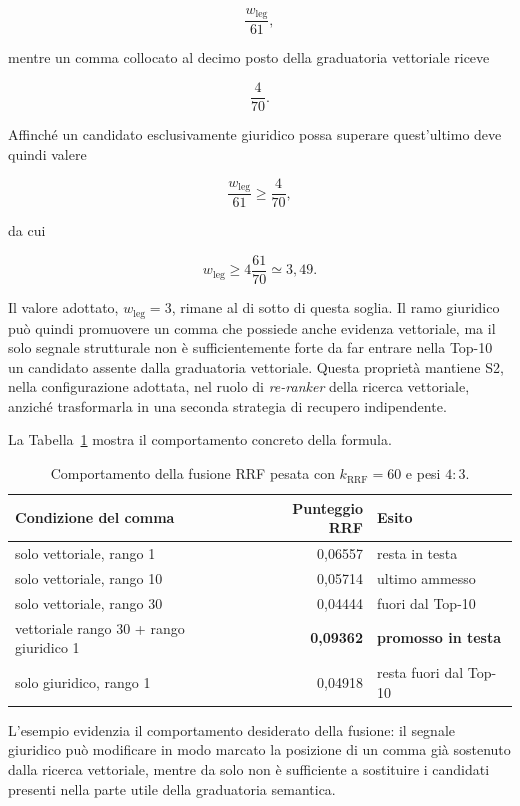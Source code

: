 $$
\frac{w_{\mathrm{leg}}}{61},
$$

mentre un comma collocato al decimo posto della graduatoria vettoriale riceve

$$
\frac{4}{70}.
$$

Affinché un candidato esclusivamente giuridico possa superare quest'ultimo deve quindi valere

$$
\frac{w_{\mathrm{leg}}}{61}
\geq
\frac{4}{70},
$$

da cui

$$
w_{\mathrm{leg}}
\geq
4\frac{61}{70}
\simeq
3{,}49.
$$

Il valore adottato, \(w_{\mathrm{leg}}=3\), rimane al di sotto di questa soglia. Il ramo giuridico può quindi promuovere un comma che possiede anche evidenza vettoriale, ma il solo segnale strutturale non è sufficientemente forte da far entrare nella Top-10 un candidato assente dalla graduatoria vettoriale. Questa proprietà mantiene S2, nella configurazione adottata, nel ruolo di \textit{re-ranker} della ricerca vettoriale, anziché trasformarla in una seconda strategia di recupero indipendente.

La Tabella~\ref{tab:aritmetica_rrf} mostra il comportamento concreto della formula.

\begin{table}[H]
\centering
\renewcommand{\arraystretch}{1.2}
\begin{tabular}{|l|r|l|}
\hline
\textbf{Condizione del comma} & \textbf{Punteggio RRF} & \textbf{Esito} \\
\hline
solo vettoriale, rango 1 & 0,06557 & resta in testa \\
solo vettoriale, rango 10 & 0,05714 & ultimo ammesso \\
solo vettoriale, rango 30 & 0,04444 & fuori dal Top-10 \\
vettoriale rango 30 + rango giuridico 1 & \textbf{0,09362} & \textbf{promosso in testa} \\
solo giuridico, rango 1 & 0,04918 & resta fuori dal Top-10 \\
\hline
\end{tabular}
\caption{Comportamento della fusione RRF pesata con \(k_{\mathrm{RRF}}=60\) e pesi \(4:3\).}
\label{tab:aritmetica_rrf}
\end{table}

L'esempio evidenzia il comportamento desiderato della fusione: il segnale giuridico può modificare in modo marcato la posizione di un comma già sostenuto dalla ricerca vettoriale, mentre da solo non è sufficiente a sostituire i candidati presenti nella parte utile della graduatoria semantica.

